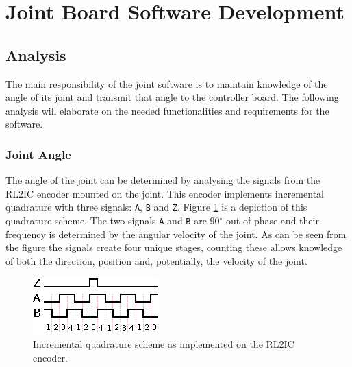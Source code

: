 \section{Joint Board Software Development} %
\label{sub:joint_board_software}

\subsection{Analysis} %
\label{ssub:joint_board_analysis}
The main responsibility of the joint software is to maintain knowledge of the angle of its joint and transmit that angle to the controller board.
The following analysis will elaborate on the needed functionalities and requirements for the software.

\subsubsection{Joint Angle}
The angle of the joint can be determined by analysing the signals from the RL2IC encoder mounted on the joint.
This encoder implements incremental quadrature with three signals: \texttt{A}, \texttt{B} and \texttt{Z}.
Figure \ref{fig:quadrature} is a depiction of this quadrature scheme.
The two signals \texttt{A} and \texttt{B} are 90$^\circ$ out of phase and their frequency is determined by the angular velocity of the joint.
As can be seen from the figure the signals create four unique stages, counting these allows knowledge of both the direction, position and, potentially, the velocity of the joint.

\begin{figure}[h]
	\centering
	\includegraphics[width=.5\linewidth]{graphics/quadrature}
	\caption[Incremental quadrature scheme RL2IC encoder.]{Incremental quadrature scheme as implemented on the RL2IC encoder.}
	\label{fig:quadrature}
\end{figure}

